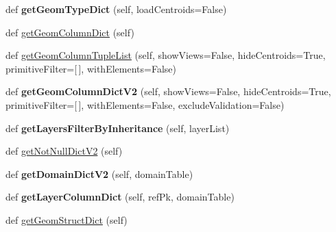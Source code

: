 \begin{DoxyCompactItemize}
def {\bfseries get\+Geom\+Type\+Dict} (self, load\+Centroids=False)
\item 
def \mbox{\hyperlink{class_dsg_tools_1_1_factories_1_1_db_factory_1_1postgis_db_1_1_postgis_db_a8be34572229ea3f0a90d93678ca80eaa}{get\+Geom\+Column\+Dict}} (self)
\item 
def \mbox{\hyperlink{class_dsg_tools_1_1_factories_1_1_db_factory_1_1postgis_db_1_1_postgis_db_ac040dfd453d8439f6a23eac91d313afc}{get\+Geom\+Column\+Tuple\+List}} (self, show\+Views=False, hide\+Centroids=True, primitive\+Filter=\mbox{[}$\,$\mbox{]}, with\+Elements=False)
\item 
\mbox{\label{class_dsg_tools_1_1_factories_1_1_db_factory_1_1postgis_db_1_1_postgis_db_a952d8f4e7609f38fbb7a03bacc2cbcca}} 
def {\bfseries get\+Geom\+Column\+Dict\+V2} (self, show\+Views=False, hide\+Centroids=True, primitive\+Filter=\mbox{[}$\,$\mbox{]}, with\+Elements=False, exclude\+Validation=False)
\item 
\mbox{\label{class_dsg_tools_1_1_factories_1_1_db_factory_1_1postgis_db_1_1_postgis_db_aea0c51f93e541fb83c01db41c20b0179}} 
def {\bfseries get\+Layers\+Filter\+By\+Inheritance} (self, layer\+List)
\item 
def \mbox{\hyperlink{class_dsg_tools_1_1_factories_1_1_db_factory_1_1postgis_db_1_1_postgis_db_aea8a82ce913538818084cc59189c6a1a}{get\+Not\+Null\+Dict\+V2}} (self)
\item 
\mbox{\label{class_dsg_tools_1_1_factories_1_1_db_factory_1_1postgis_db_1_1_postgis_db_aac4277a34947db2d599a76c01b40ab92}} 
def {\bfseries get\+Domain\+Dict\+V2} (self, domain\+Table)
\item 
\mbox{\label{class_dsg_tools_1_1_factories_1_1_db_factory_1_1postgis_db_1_1_postgis_db_a420ba6465c213459f68634c485d83047}} 
def {\bfseries get\+Layer\+Column\+Dict} (self, ref\+Pk, domain\+Table)
\item 
def \mbox{\hyperlink{class_dsg_tools_1_1_factories_1_1_db_factory_1_1postgis_db_1_1_postgis_db_ab6ab584551ee1175f693e3c1dddf4039}{get\+Geom\+Struct\+Dict}} (self)
\item 

\end{DoxyCompactItemize}
